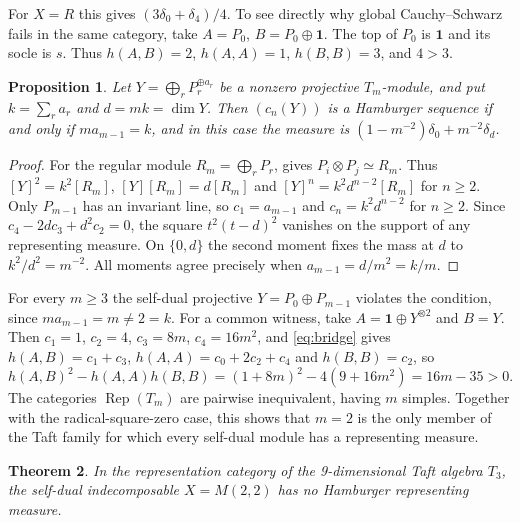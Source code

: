 \documentclass[11pt,reqno]{amsart}
\newtheorem{theorem}{Theorem}[section]
\newtheorem{proposition}[theorem]{Proposition}
\theoremstyle{definition}
\newcommand{\one}{\mathbf 1}
\newcommand{\Rep}{\operatorname{Rep}}
\begin{document}
For $X=R$ this gives $(3\delta_0+\delta_4)/4$. To see directly why
global Cauchy--Schwarz fails in the same category, take $A=P_0$,
$B=P_0\oplus\one$. The top of $P_0$ is $\one$ and its socle is $s$.
Thus $h(A,B)=2$, $h(A,A)=1$, $h(B,B)=3$, and $4>3$.

\begin{proposition}\label{prop:taft-projectives}
Let $Y=\bigoplus_rP_r^{\oplus a_r}$ be a nonzero projective $T_m$-module, and put $k=\sum_ra_r$ and $d=mk=\dim Y$. Then $(c_n(Y))$ is a Hamburger sequence if and only if $ma_{m-1}=k$, and in this case the measure is $(1-m^{-2})\delta_0+m^{-2}\delta_d$.
\end{proposition}

\begin{proof}
For the regular module $R_m=\bigoplus_rP_r$, \cite[Proposition~3.2]{CVZ} gives $P_i\otimes P_j\simeq R_m$. Thus $[Y]^2=k^2[R_m]$, $[Y][R_m]=d[R_m]$ and $[Y]^n=k^2d^{n-2}[R_m]$ for $n\ge2$. Only $P_{m-1}$ has an invariant line, so $c_1=a_{m-1}$ and $c_n=k^2d^{n-2}$ for $n\ge2$. Since $c_4-2dc_3+d^2c_2=0$, the square $t^2(t-d)^2$ vanishes on the support of any representing measure. On $\{0,d\}$ the second moment fixes the mass at $d$ to $k^2/d^2=m^{-2}$. All moments agree precisely when $a_{m-1}=d/m^2=k/m$.
\end{proof}

For every $m\geq3$ the self-dual projective $Y=P_0\oplus P_{m-1}$ violates the condition, since $ma_{m-1}=m\neq2=k$. For a common witness, take $A=\one\oplus Y^{\otimes2}$ and $B=Y$. Then $c_1=1$, $c_2=4$, $c_3=8m$, $c_4=16m^2$, and \eqref{eq:bridge} gives $h(A,B)=c_1+c_3$, $h(A,A)=c_0+2c_2+c_4$ and $h(B,B)=c_2$, so
\[
 h(A,B)^2-h(A,A)h(B,B)=(1+8m)^2-4(9+16m^2)=16m-35>0 .
\]
The categories $\Rep(T_m)$ are pairwise inequivalent, having $m$ simples. Together with the radical-square-zero case, this shows that $m=2$ is the only member of the Taft family for which every self-dual module has a representing measure.

\begin{theorem}\label{thm:taft-failure}
In the representation category of the 9-dimensional Taft algebra $T_3$, the self-dual indecomposable $X=M(2,2)$ has no Hamburger representing measure.
\end{theorem}
\end{document}
